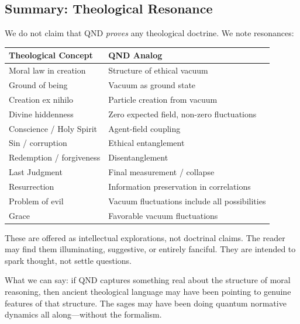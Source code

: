 \documentclass[12pt]{article}
\begin{document}
\subsection{Summary: Theological Resonance}

We do not claim that QND \emph{proves} any theological doctrine. We note resonances:

\begin{table}[h]
\centering
\begin{tabular}{ll}
\toprule
\textbf{Theological Concept} & \textbf{QND Analog} \\
\midrule
Moral law in creation & Structure of ethical vacuum \\
Ground of being & Vacuum as ground state \\
Creation ex nihilo & Particle creation from vacuum \\
Divine hiddenness & Zero expected field, non-zero fluctuations \\
Conscience / Holy Spirit & Agent-field coupling \\
Sin / corruption & Ethical entanglement \\
Redemption / forgiveness & Disentanglement \\
Last Judgment & Final measurement / collapse \\
Resurrection & Information preservation in correlations \\
Problem of evil & Vacuum fluctuations include all possibilities \\
Grace & Favorable vacuum fluctuations \\
\bottomrule
\end{tabular}
\end{table}

These are offered as intellectual explorations, not doctrinal claims. The reader may find them illuminating, suggestive, or entirely fanciful. They are intended to spark thought, not settle questions.

What we can say: if QND captures something real about the structure of moral reasoning, then ancient theological language may have been pointing to genuine features of that structure. The sages may have been doing quantum normative dynamics all along---without the formalism.
\end{document}
